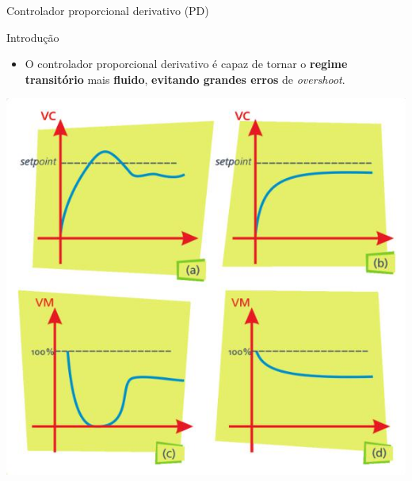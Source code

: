 \begin{frame}{Controlador proporcional derivativo (PD)}
	\begin{block}{Introdução}
		\begin{itemize}
			\item O controlador proporcional derivativo é capaz de tornar o \textbf{regime transitório} mais \textbf{fluido}, \textbf{evitando grandes erros} de \textit{overshoot}.
		\end{itemize}
	\end{block}

	\vspace{0.5cm}

	\centering
	\includegraphics[height=0.6\textheight]{Figuras/Ch12/fig8}
	
\end{frame}


